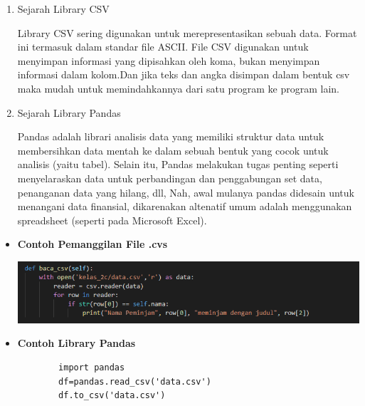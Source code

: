 \documentclass[a4paper,12pt]{report}
\begin{document}
\begin{enumerate}
    \item Sejarah Library CSV
    \par Library CSV sering digunakan untuk merepresentasikan sebuah data. Format ini termasuk dalam standar file ASCII. File CSV digunakan untuk menyimpan informasi yang dipisahkan oleh koma, bukan menyimpan informasi dalam kolom.Dan jika teks dan angka disimpan dalam bentuk csv maka mudah untuk memindahkannya dari satu program ke program lain. 
    
    \item Sejarah Library Pandas
    \par Pandas adalah librari analisis data yang memiliki struktur data untuk membersihkan data mentah ke dalam sebuah bentuk yang cocok untuk analisis (yaitu tabel). Selain itu, Pandas melakukan tugas penting seperti menyelaraskan data untuk perbandingan dan penggabungan set data, penanganan data yang hilang, dll, Nah, awal mulanya pandas didesain untuk menangani data finansial, dikarenakan altenatif umum adalah menggunakan spreadsheet (seperti pada Microsoft Excel).
    
\end{enumerate}
\begin{itemize}
    \item \textbf{Contoh Pemanggilan File .cvs}
    \begin{center}
    \includegraphics[width=11cm\textwidth]{figure/baca.png}
    \end{center}
    \item \textbf{Contoh Library Pandas}
    \begin{verbatim}
        import pandas
        df=pandas.read_csv('data.csv')
        df.to_csv('data.csv')
    \end{verbatim}
\end{itemize}
\end{document}
